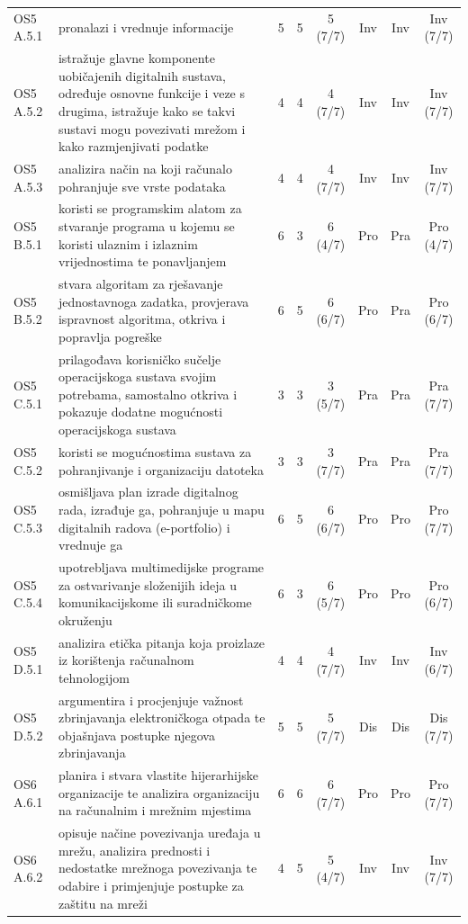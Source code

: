 \documentclass[journal,article,submit,pdftex,moreauthors]{Definitions/mdpi}
\begin{document}
{\begin{longtable}{p{1.35cm}p{6.6cm}cccccc}
OS5 A.5.1 & pronalazi i vrednuje informacije & 5 & 5 & 5 (7/7) & Inv & Inv & Inv (7/7) \\
OS5 A.5.2 & istražuje glavne komponente uobičajenih digitalnih sustava, određuje osnovne funkcije i veze s drugima, istražuje kako se takvi sustavi mogu povezivati mrežom i kako razmjenjivati podatke & 4 & 4 & 4 (7/7) & Inv & Inv & Inv (7/7) \\
OS5 A.5.3 & analizira način na koji računalo pohranjuje sve vrste podataka & 4 & 4 & 4 (7/7) & Inv & Inv & Inv (7/7) \\
OS5 B.5.1 & koristi se programskim alatom za stvaranje programa u kojemu se koristi ulaznim i izlaznim vrijednostima te ponavljanjem & 6 & 3 & 6 (4/7) & Pro & Pra & Pro (4/7) \\
OS5 B.5.2 & stvara algoritam za rješavanje jednostavnoga zadatka, provjerava ispravnost algoritma, otkriva i popravlja pogreške & 6 & 5 & 6 (6/7) & Pro & Pra & Pro (6/7) \\
OS5 C.5.1 & prilagođava korisničko sučelje operacijskoga sustava svojim potrebama, samostalno otkriva i pokazuje dodatne mogućnosti operacijskoga sustava & 3 & 3 & 3 (5/7) & Pra & Pra & Pra (7/7) \\
OS5 C.5.2 & koristi se mogućnostima sustava za pohranjivanje i organizaciju datoteka & 3 & 3 & 3 (7/7) & Pra & Pra & Pra (7/7) \\
OS5 C.5.3 & osmišljava plan izrade digitalnog rada, izrađuje ga, pohranjuje u mapu digitalnih radova (e-portfolio) i vrednuje ga & 6 & 5 & 6 (6/7) & Pro & Pro & Pro (7/7) \\
OS5 C.5.4 & upotrebljava multimedijske programe za ostvarivanje složenijih ideja u komunikacijskome ili suradničkome okruženju & 6 & 3 & 6 (5/7) & Pro & Pro & Pro (6/7) \\
OS5 D.5.1 & analizira etička pitanja koja proizlaze iz korištenja računalnom tehnologijom & 4 & 4 & 4 (7/7) & Inv & Inv & Inv (6/7) \\
OS5 D.5.2 & argumentira i procjenjuje važnost zbrinjavanja elektroničkoga otpada te objašnjava postupke njegova zbrinjavanja & 5 & 5 & 5 (7/7) & Dis & Dis & Dis (7/7) \\
OS6 A.6.1 & planira i stvara vlastite hijerarhijske organizacije te analizira organizaciju na računalnim i mrežnim mjestima & 6 & 6 & 6 (7/7) & Pro & Pro & Pro (7/7) \\
OS6 A.6.2 & opisuje načine povezivanja uređaja u mrežu, analizira prednosti i nedostatke mrežnoga povezivanja te odabire i primjenjuje postupke za zaštitu na mreži & 4 & 5 & 5 (4/7) & Inv & Inv & Inv (7/7) \\

\end{longtable}}
\end{document}
